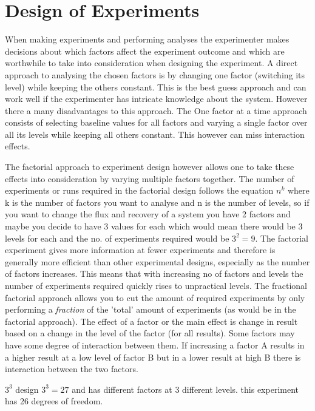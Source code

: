 \section{Design of Experiments}
When making experiments and performing analyses the experimenter makes decisions about which factors affect the experiment outcome and which are worthwhile to take into consideration when designing the experiment.
A direct approach to analysing the chosen factors is by changing one factor (switching its level) while keeping the others constant.
This is the best guess approach and can work well if the experimenter has intricate knowledge about the system.
However there a many disadvantages to this approach.
The One factor at a time approach consists of selecting baseline values for all factors and varying a single factor over all its levels while keeping all others constant.
This however can miss interaction effects.

The factorial approach to experiment design however allows one to take these effects into consideration by varying multiple factors together.
The number of experiments or runs required in the factorial design  follows the equation  $n^k$
where k is the number of factors you want to analyse and n is the number of levels, so if you want to change the flux and recovery of a system you have 2 factors and maybe you decide to have 3 values for each which would mean there would be 3 levels for each and the no. of experiments required would be $3^2=9$.
The factorial experiment gives more information at fewer experiments and therefore is generally more efficient than other experimental designs, especially as the number of factors increases.
This means that with increasing no of factors and levels the number of experiments required quickly rises to unpractical levels.
The fractional factorial approach allows you to cut the amount of required experiments by only performing a \textit{fraction} of the 'total' amount of experiments (as would be in the factorial approach).
The effect of a factor or the main effect is change in result based on a change in the level of the factor (for all results).
Some factors may have some degree of interaction between them.
If increasing a factor A results in a higher result at a low level of factor B but in a lower result at high B there is interaction between the two factors.


$3^3$ design %
$3^3=27$ and has different factors at 3 different levels.
this experiment has 26 degrees of freedom. 


